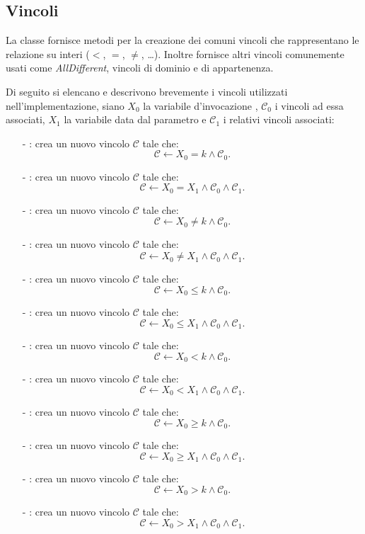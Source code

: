 \subsection{Vincoli}
La classe  fornisce metodi per la creazione dei comuni vincoli
che rappresentano le relazione su interi ($<$, $=$, $\neq$, \ldots). 
Inoltre fornisce altri
vincoli comunemente usati come \emph{AllDifferent}, vincoli di dominio e di
appartenenza.

Di seguito si elencano e descrivono brevemente i vincoli utilizzati 
nell'implementazione, siano
$X_0$ la variabile d'invocazione , $\mathcal{C}_0$ i vincoli ad 
essa associati, $X_1$ la variabile data dal parametro  e 
$\mathcal{C}_1$ i relativi vincoli associati:
\begin{itemize}
\item[-]: 
crea un nuovo vincolo $\mathcal{C}$ tale che:
\[
\mathcal{C} \leftarrow X_0 = k \wedge \mathcal{C}_0.
\]
\item[-]: crea un nuovo vincolo $\mathcal{C}$ 
tale che:
\[
\mathcal{C} \leftarrow X_0 = X_1 \wedge \mathcal{C}_0 \wedge \mathcal{C}_1.
\]
\item[-]: 
crea un nuovo vincolo $\mathcal{C}$ tale che:
\[
\mathcal{C} \leftarrow X_0 \neq k \wedge \mathcal{C}_0.
\]
\item[-]: crea un nuovo vincolo $\mathcal{C}$ 
tale che:
\[
\mathcal{C} \leftarrow X_0 \neq X_1 \wedge \mathcal{C}_0 \wedge \mathcal{C}_1.
\]
\item[-]: 
crea un nuovo vincolo $\mathcal{C}$ tale che:
\[
\mathcal{C} \leftarrow X_0 \leq k \wedge \mathcal{C}_0.
\]
\item[-]: crea un nuovo vincolo $\mathcal{C}$ 
tale che:
\[
\mathcal{C} \leftarrow X_0 \leq X_1 \wedge \mathcal{C}_0 \wedge \mathcal{C}_1.
\]
\item[-]: 
crea un nuovo vincolo $\mathcal{C}$ tale che:
\[
\mathcal{C} \leftarrow X_0 < k \wedge \mathcal{C}_0.
\]
\item[-]: crea un nuovo vincolo $\mathcal{C}$ 
tale che:
\[
\mathcal{C} \leftarrow X_0 < X_1 \wedge \mathcal{C}_0 \wedge \mathcal{C}_1.
\]
\item[-]: 
crea un nuovo vincolo $\mathcal{C}$ tale che:
\[
\mathcal{C} \leftarrow X_0 \geq k \wedge \mathcal{C}_0.
\]
\item[-]: crea un nuovo vincolo $\mathcal{C}$ 
tale che:
\[
\mathcal{C} \leftarrow X_0 \geq X_1 \wedge \mathcal{C}_0 \wedge \mathcal{C}_1.
\]
\item[-]: 
crea un nuovo vincolo $\mathcal{C}$ tale che:
\[
\mathcal{C} \leftarrow X_0 > k \wedge \mathcal{C}_0.
\]
\item[-]: crea un nuovo vincolo $\mathcal{C}$ 
tale che:
\[
\mathcal{C} \leftarrow X_0 > X_1 \wedge \mathcal{C}_0 \wedge \mathcal{C}_1.
\]
\end{itemize}

